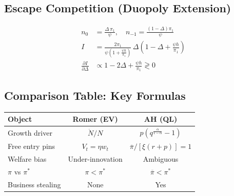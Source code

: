 \documentclass[a4paper,11pt]{article}
\newcommand{\pibar}{\overline{\pi}}
\begin{document}
\subsection*{Escape Competition (Duopoly Extension)}
\begin{align*}
n_0 &= \frac{\Delta\,\pi_1}{\psi}, \quad n_{-1} = \frac{(1-\Delta)\pi_1}{\psi} \tag{Innovation Rates}\\
I &= \frac{2\pi_1}{\psi\!\left(1+\frac{\psi h}{\pi_1}\right)}\,\Delta\!\left(1-\Delta+\frac{\psi h}{\pi_1}\right) \tag{Aggregate Innovation}\\
\frac{\partial I}{\partial \Delta} &\propto 1 - 2\Delta + \frac{\psi h}{\pi_1} \gtrless 0 \tag{Inverted-U}
\end{align*}

\subsection*{Comparison Table: Key Formulas}
\begin{center}
\begin{tabular}{lcc}
\toprule
\textbf{Object} & \textbf{Romer (EV)} & \textbf{AH (QL)} \\
\midrule
Growth driver & $\dot{N}/N$ & $p(q^{\frac{\alpha}{1-\alpha}}-1)$ \\
Free entry pins & $V_t = \eta w_t$ & $\pibar/[\xi(r+p)] = 1$ \\
Welfare bias & Under-innovation & Ambiguous \\
$\pi$ vs $\pi^*$ & $\pi < \pi^*$ & $\pibar < \pi^*$ \\
Business stealing & None & Yes \\
\bottomrule
\end{tabular}
\end{center}
\end{document}
